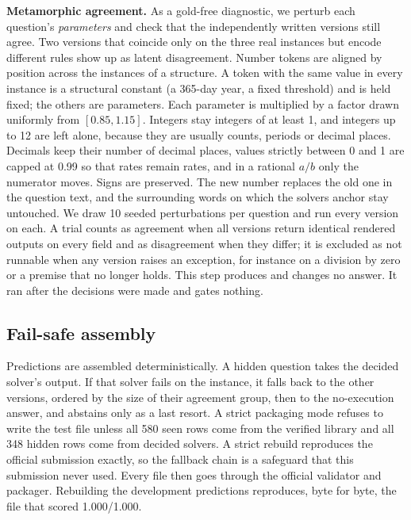 \documentclass[conference]{IEEEtran}
\begin{document}
\textbf{Metamorphic agreement.} As a gold-free diagnostic, we perturb each question's \emph{parameters} and check that
the independently written versions still agree. Two versions that coincide only on
the three real instances but encode different rules show up as latent disagreement. Number tokens are aligned by
position across the instances of a structure. A token with the same value in every instance is a structural constant
(a 365-day year, a fixed threshold) and is held fixed; the others are parameters. Each parameter is multiplied by a
factor drawn uniformly from $[0.85, 1.15]$. Integers stay integers of at least 1, and integers up to 12 are left
alone, because they are usually counts, periods or decimal places. Decimals keep their number of decimal places,
values strictly between 0 and 1 are capped at 0.99 so that rates remain rates, and in a rational $a/b$ only the
numerator moves. Signs are preserved. The new number replaces the old one in the question text, and the surrounding
words on which the solvers anchor stay untouched. We draw 10 seeded perturbations per question and run every version on
each. A trial counts as agreement when all versions return identical rendered outputs on every field and as
disagreement when they differ; it is excluded as not runnable when any version raises an exception, for instance on a
division by zero or a premise that no longer holds. This step produces and changes no answer. It ran after the
decisions were made and gates nothing.

\subsection{Fail-safe assembly}
Predictions are assembled deterministically. A hidden question takes the decided solver's output. If that solver fails
on the instance, it falls back to the other versions, ordered by the size of their agreement group, then to the
no-execution answer, and abstains only as a last resort. A strict packaging mode refuses to write the test file
unless all 580 seen rows come from the verified library and all 348 hidden rows come from decided solvers. A strict
rebuild reproduces the official submission exactly, so the fallback chain is a safeguard that this submission never
used. Every file
then goes through the official validator and packager. Rebuilding the development predictions reproduces, byte for
byte, the file that scored 1.000/1.000.
\end{document}
